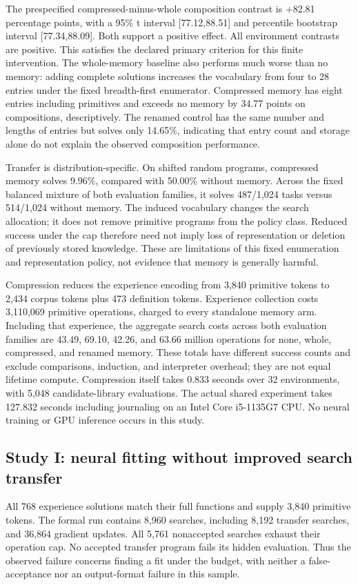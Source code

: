 \documentclass[11pt]{article}
\begin{document}
The prespecified compressed-minus-whole composition contrast is +82.81
percentage points, with a 95\% t interval [77.12,88.51] and percentile
bootstrap interval [77.34,88.09]. Both support a positive effect. All environment
contrasts are positive. This satisfies the declared primary criterion for
this finite intervention. The whole-memory baseline also performs much worse
than no memory: adding complete solutions increases the vocabulary from four
to 28 entries under the fixed breadth-first enumerator. Compressed memory
has eight entries including primitives and exceeds no memory by 34.77 points
on compositions, descriptively. The renamed control has the same number and
lengths of entries but solves only 14.65\%, indicating that entry count and
storage alone do not explain the observed composition performance.

Transfer is distribution-specific. On shifted random programs, compressed
memory solves 9.96\%, compared with 50.00\% without memory. Across the fixed
balanced mixture of both evaluation families, it solves 487/1,024 tasks
versus 514/1,024 without memory. The induced vocabulary changes the search
allocation; it does not remove primitive programs from the policy class.
Reduced success under the cap therefore need not imply loss of representation
or deletion of previously stored knowledge. These are limitations of this
fixed enumeration and representation policy, not evidence that memory is
generally harmful.

Compression reduces the experience encoding from 3,840 primitive tokens to
2,434 corpus tokens plus 473 definition tokens. Experience collection costs
3,110,069 primitive operations, charged to every standalone memory arm.
Including that experience, the aggregate search costs across both evaluation
families are 43.49, 69.10, 42.26, and 63.66 million operations for none,
whole, compressed, and renamed memory. These totals have different success
counts and exclude comparisons, induction, and interpreter overhead; they
are not equal lifetime compute. Compression itself takes 0.833 seconds over
32 environments, with 5,048 candidate-library evaluations. The actual shared
experiment takes 127.832 seconds including journaling on an Intel
Core i5-1135G7 CPU. No neural training or GPU inference occurs in this study.

\subsection{Study I: neural fitting without improved search transfer}
All 768 experience solutions match their full functions and supply 3,840
primitive tokens. The formal run contains 8,960 searches, including 8,192
transfer searches, and 36,864 gradient updates. All 5,761 nonaccepted searches
exhaust their operation cap. No accepted transfer program fails its hidden
evaluation. Thus the observed failure concerns finding a fit under the budget,
with neither a false-acceptance nor an output-format failure in this sample.
\end{document}
